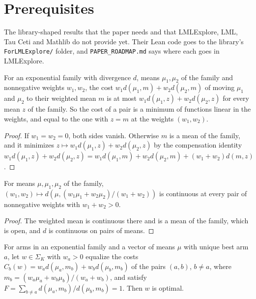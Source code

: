 \chapter{Prerequisites}
\label{chap:prerequisites}

The library-shaped results that the paper needs and that LMLExplore, LML, Tau Ceti and Mathlib do
not provide yet. Their Lean code goes to the library's \texttt{ForLMLExplore/} folder, and
\texttt{PAPER\_ROADMAP.md} says where each goes in LMLExplore.

\begin{lemma}
  \label{prereq:pair_cost_linear}
  \leanok
  For an exponential family with divergence $d$, means $\mu_1, \mu_2$ of the family and
  nonnegative weights $w_1, w_2$, the cost $w_1 d(\mu_1, m) + w_2 d(\mu_2, m)$ of moving $\mu_1$
  and $\mu_2$ to their weighted mean $m$ is at most $w_1 d(\mu_1, z) + w_2 d(\mu_2, z)$ for every
  mean $z$ of the family. So the cost of a pair is a minimum of functions linear in the weights,
  and equal to the one with $z = m$ at the weights $(w_1, w_2)$.
\end{lemma}

\begin{proof}
  \leanok
  If $w_1 = w_2 = 0$, both sides vanish. Otherwise $m$ is a mean of the family, and it minimizes
  $z \mapsto w_1 d(\mu_1, z) + w_2 d(\mu_2, z)$ by the compensation identity
  $w_1 d(\mu_1, z) + w_2 d(\mu_2, z) = w_1 d(\mu_1, m) + w_2 d(\mu_2, m) + (w_1 + w_2) d(m, z)$.
\end{proof}

\begin{lemma}
  \label{prereq:div_mean_continuous}
  \leanok
  For means $\mu, \mu_1, \mu_2$ of the family, $(w_1, w_2) \mapsto
  d(\mu, (w_1\mu_1 + w_2\mu_2)/(w_1 + w_2))$ is continuous at every pair of nonnegative weights
  with $w_1 + w_2 > 0$.
\end{lemma}

\begin{proof}
  \leanok
  The weighted mean is continuous there and is a mean of the family, which is open, and $d$ is
  continuous on pairs of means.
\end{proof}

\begin{lemma}
  \label{prereq:scalar_opt}
  \leanok
  For arms in an exponential family and a vector of means $\mu$ with unique best arm $a$, let
  $w \in \Sigma_K$ with $w_a > 0$ equalize the costs
  $C_b(w) = w_a d(\mu_a, m_b) + w_b d(\mu_b, m_b)$ of the pairs $(a, b)$, $b \ne a$, where
  $m_b = (w_a\mu_a + w_b\mu_b)/(w_a + w_b)$, and satisfy
  $F = \sum_{b \ne a} d(\mu_a, m_b) / d(\mu_b, m_b) = 1$. Then $w$ is optimal.
\end{lemma}

